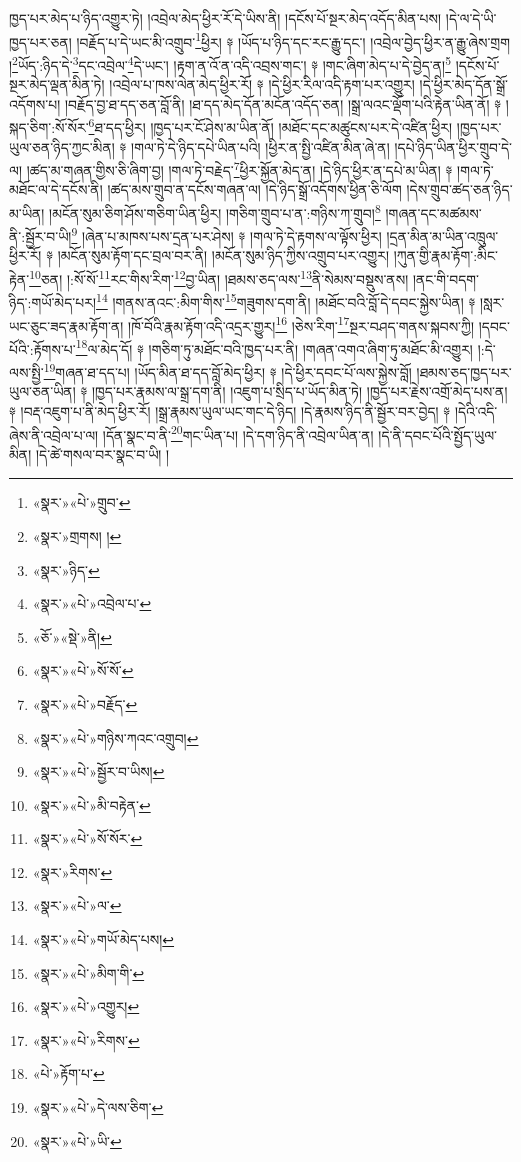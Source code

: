 ཁྱད་པར་མེད་པ་ཉིད་འགྱུར་ཏེ། །འབྲེལ་མེད་ཕྱིར་རོ་དེ་ཡིས་ནི། །དངོས་པོ་སྔར་མེད་འདོད་མིན་པས། །དེ་ལ་དེ་ཡི་ཁྱད་པར་ཅན། །བརྗོད་པ་དེ་ཡང་མི་འགྲུབ་\footnote{«སྣར་»«པེ་»གྲུབ་}ཕྱིར། ༈ །ཡོད་པ་ཉིད་དང་རང་རྒྱུ་དང་། །འབྲེལ་བྱེད་ཕྱིར་ན་རྒྱུ་ཞེས་གྲག །\footnote{«སྣར་»གྲགས། །}ཡོད་:ཉིད་དེ་\footnote{«སྣར་»ཉིད་}དང་འབྲེལ་\footnote{«སྣར་»«པེ་»འབྲེལ་པ་}དེ་ཡང་། །རྟག་ན་འོ་ན་འདི་འབྲས་གང་། ༈ །གང་ཞིག་མེད་པ་དེ་བྱེད་ན།\footnote{«ཅོ་»«སྡེ་»ནི།} །དངོས་པོ་སྔར་མེད་ལྡན་མིན་ཏེ། །འབྲེལ་པ་ཁས་ལེན་མེད་ཕྱིར་རོ། ༈ །དེ་ཕྱིར་རིལ་འདི་རྟག་པར་འགྱུར། །དེ་ཕྱིར་མེད་དོན་སྒྲོ་འདོགས་པ། །བརྗོད་བྱ་ཐ་དད་ཅན་བློ་ནི། །ཐ་དད་མེད་དོན་མངོན་འདོད་ཅན། །སྒྲ་ལའང་ལྡོག་པའི་རྟེན་ཡིན་ནོ། ༈ །སྐད་ཅིག་:སོ་སོར་\footnote{«སྣར་»«པེ་»སོ་སོ་}ཐ་དད་ཕྱིར། །ཁྱད་པར་ངོ་ཤེས་མ་ཡིན་ནོ། །མཐོང་དང་མཚུངས་པར་དེ་འཛིན་ཕྱིར། །ཁྱད་པར་ཡུལ་ཅན་ཉིད་ཀྱང་མིན། ༈ །གལ་ཏེ་དེ་ཉིད་དཔེ་ཡིན་པའི། །ཕྱིར་ན་སྤྱི་འཛིན་མིན་ཞེ་ན། །དཔེ་ཉིད་ཡིན་ཕྱིར་གྲུབ་དེ་ལ། །ཚད་མ་གཞན་གྱིས་ཅི་ཞིག་བྱ། །གལ་ཏེ་བརྗེད་\footnote{«སྣར་»«པེ་»བརྗོད་}ཕྱིར་སྐྱོན་མེད་ན། །དེ་ཉིད་ཕྱིར་ན་དཔེ་མ་ཡིན། ༈ །གལ་ཏེ་མཐོང་ལ་དེ་དངོས་ནི། །ཚད་མས་གྲུབ་ན་དངོས་གཞན་ལ། །དེ་ཉིད་སྒྲོ་འདོགས་ཕྱིན་ཅི་ལོག །དེས་གྲུབ་ཚད་ཅན་ཉིད་མ་ཡིན། །མངོན་སུམ་ཅིག་ཤོས་གཅིག་ཡིན་ཕྱིར། །གཅིག་གྲུབ་པ་ན་:གཉིས་ཀ་གྲུབ།\footnote{«སྣར་»«པེ་»གཉིས་ཀའང་འགྲུབ།} །གཞན་དང་མཚམས་ནི་:སྦྱོར་བ་ཡི།\footnote{«སྣར་»«པེ་»སྦྱོར་བ་ཡིས།} །ཞེན་པ་མཁས་པས་དྲན་པར་ཤེས། ༈ །གལ་ཏེ་དེ་རྟགས་ལ་ལྟོས་ཕྱིར། །དྲན་མིན་མ་ཡིན་འཁྲུལ་ཕྱིར་རོ། ༈ །མངོན་སུམ་རྟོག་དང་བྲལ་བར་ནི། །མངོན་སུམ་ཉིད་ཀྱིས་འགྲུབ་པར་འགྱུར། །ཀུན་གྱི་རྣམ་རྟོག་:མིང་རྟེན་\footnote{«སྣར་»«པེ་»མི་བརྟེན་}ཅན། །:སོ་སོ་\footnote{«སྣར་»«པེ་»སོ་སོར་}རང་གིས་རིག་\footnote{«སྣར་»རིགས་}བྱ་ཡིན། །ཐམས་ཅད་ལས་\footnote{«སྣར་»«པེ་»ལ་}ནི་སེམས་བསྡུས་ནས། །ནང་གི་བདག་ཉིད་:གཡོ་མེད་པར།\footnote{«སྣར་»«པེ་»གཡོ་མེད་པས།} །གནས་ནའང་:མིག་གིས་\footnote{«སྣར་»«པེ་»མིག་གི་}གཟུགས་དག་ནི། །མཐོང་བའི་བློ་དེ་དབང་སྐྱེས་ཡིན། ༈ །སླར་ཡང་ཅུང་ཟད་རྣམ་རྟོག་ན། །ཁོ་བོའི་རྣམ་རྟོག་འདི་འདྲར་གྱུར།\footnote{«སྣར་»«པེ་»འགྱུར།} །ཅེས་རིག་\footnote{«སྣར་»«པེ་»རིགས་}སྔར་བཤད་གནས་སྐབས་ཀྱི། །དབང་པོའི་:རྟོགས་པ་\footnote{«པེ་»རྟོག་པ་}ལ་མེད་དོ། ༈ །གཅིག་ཏུ་མཐོང་བའི་ཁྱད་པར་ནི། །གཞན་འགའ་ཞིག་ཏུ་མཐོང་མི་འགྱུར། །:དེ་ལས་སྤྱི་\footnote{«སྣར་»«པེ་»དེ་ལས་ཅིག་}གཞན་ཐ་དད་པ། །ཡོད་མིན་ཐ་དད་བློ་མེད་ཕྱིར། ༈ །དེ་ཕྱིར་དབང་པོ་ལས་སྐྱེས་བློ། །ཐམས་ཅད་ཁྱད་པར་ཡུལ་ཅན་ཡིན། ༈ །ཁྱད་པར་རྣམས་ལ་སྒྲ་དག་ནི། །འཇུག་པ་སྲིད་པ་ཡོད་མིན་ཏེ། །ཁྱད་པར་རྗེས་འགྲོ་མེད་པས་ན། ༈ །བརྡ་འཇུག་པ་ནི་མེད་ཕྱིར་རོ། །སྒྲ་རྣམས་ཡུལ་ཡང་གང་དེ་ཉིད། །དེ་རྣམས་ཉིད་ནི་སྦྱོར་བར་བྱེད། ༈ །དེའི་འདི་ཞེས་ནི་འབྲེལ་པ་ལ། །དོན་སྣང་བ་ནི་\footnote{«སྣར་»«པེ་»ཡི་}གང་ཡིན་པ། །དེ་དག་ཉིད་ནི་འབྲེལ་ཡིན་ན། །དེ་ནི་དབང་པོའི་སྤྱོད་ཡུལ་མིན། །དེ་ཚེ་གསལ་བར་སྣང་བ་ཡི། །
